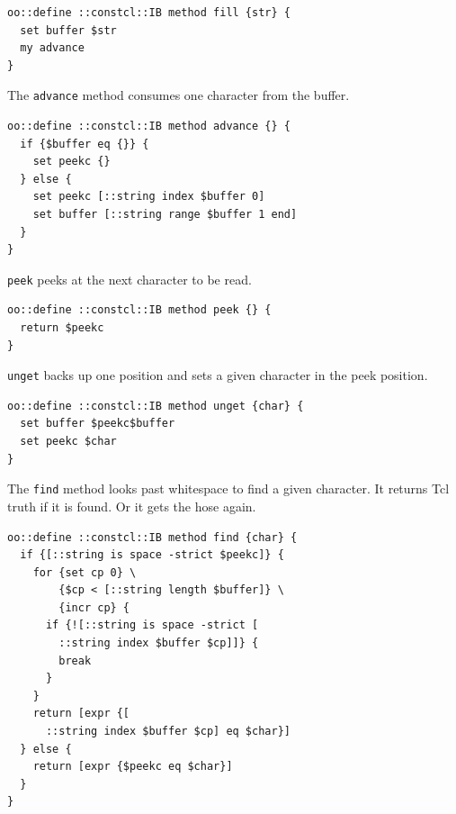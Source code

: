 \documentclass[twoside,9pt]{report}
\begin{document}
\noindent\makebox[\linewidth]{\rule{\linewidth}{0.4pt}}
\begin{lstlisting}
oo::define ::constcl::IB method fill {str} {
  set buffer $str
  my advance
}
\end{lstlisting}
\noindent\makebox[\linewidth]{\rule{\linewidth}{0.4pt}}

The \texttt{advance} method consumes one character from the buffer.

\noindent\makebox[\linewidth]{\rule{\linewidth}{0.4pt}}
\begin{lstlisting}
oo::define ::constcl::IB method advance {} {
  if {$buffer eq {}} {
    set peekc {}
  } else {
    set peekc [::string index $buffer 0]
    set buffer [::string range $buffer 1 end]
  }
}
\end{lstlisting}
\noindent\makebox[\linewidth]{\rule{\linewidth}{0.4pt}}

\texttt{peek} peeks at the next character to be read.

\noindent\makebox[\linewidth]{\rule{\linewidth}{0.4pt}}
\begin{lstlisting}
oo::define ::constcl::IB method peek {} {
  return $peekc
}
\end{lstlisting}
\noindent\makebox[\linewidth]{\rule{\linewidth}{0.4pt}}

\texttt{unget} backs up one position and sets a given character in the peek position.

\noindent\makebox[\linewidth]{\rule{\linewidth}{0.4pt}}
\begin{lstlisting}
oo::define ::constcl::IB method unget {char} {
  set buffer $peekc$buffer
  set peekc $char
}
\end{lstlisting}
\noindent\makebox[\linewidth]{\rule{\linewidth}{0.4pt}}

The \texttt{find} method looks past whitespace to find a given character. It returns Tcl truth if it is found. Or it gets the hose again.

\noindent\makebox[\linewidth]{\rule{\linewidth}{0.4pt}}
\begin{lstlisting}
oo::define ::constcl::IB method find {char} {
  if {[::string is space -strict $peekc]} {
    for {set cp 0} \
        {$cp < [::string length $buffer]} \
        {incr cp} {
      if {![::string is space -strict [
        ::string index $buffer $cp]]} {
        break
      }
    }
    return [expr {[
      ::string index $buffer $cp] eq $char}]
  } else {
    return [expr {$peekc eq $char}]
  }
}
\end{lstlisting}
\noindent\makebox[\linewidth]{\rule{\linewidth}{0.4pt}}
\end{document}
